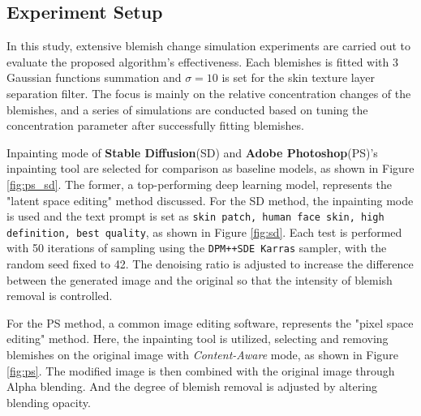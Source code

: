 \begin{spacing}{1.5}
\section{Experiment Setup}
In this study, extensive blemish change simulation experiments are carried out to evaluate the proposed algorithm's effectiveness. Each blemishes is fitted with 3 Gaussian functions summation and $\sigma=10$ is set for the skin texture layer separation filter. The focus is mainly on the relative concentration changes of the blemishes, and a series of simulations are conducted based on tuning the concentration parameter after successfully fitting blemishes.

Inpainting mode of \textbf{Stable Diffusion}(SD)\cite{rombach2021highresolution} and \textbf{Adobe Photoshop}(PS)'s inpainting tool\cite{adobephotoshop} are selected for comparison as baseline models, as shown in Figure \ref{fig:ps_sd}. The former, a top-performing deep learning model, represents the "latent space editing" method discussed. For the SD method, the inpainting mode is used and the text prompt is set as \texttt{skin patch, human face skin, high definition, best quality}, as shown in Figure \ref{fig:sd}. Each test is performed with 50 iterations of sampling using the \texttt{DPM++SDE Karras} sampler, with the random seed fixed to 42. The denoising ratio is adjusted to increase the difference between the generated image and the original so that the intensity of blemish removal is controlled. 

For the PS method, a common image editing software, represents the "pixel space editing" method. Here, the inpainting tool is utilized, selecting and removing blemishes on the original image with \textit{Content-Aware} mode, as shown in Figure \ref{fig:ps}. The modified image is then combined with the original image through Alpha blending. And the degree of blemish removal is adjusted by altering blending opacity.


\end{spacing}
